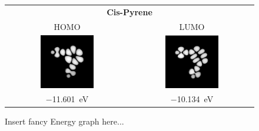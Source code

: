 
	\graphicspath{{./images/molecules/orbitals/cis-pyrene/}}
	\begin{figure}[]
		\begin{minipage}{0.2\textwidth} \centering
		\end{minipage}
		\hfill
		\begin{minipage}{0.4\textwidth} \centering 
			\begin{tabular}{c|c}
				\multicolumn{2}{c}{\textbf{Cis-Pyrene}} \\
				HOMO & LUMO \\
				\includegraphics[width=0.45\textwidth]{homo} &
				\includegraphics[width=0.45\textwidth]{lumo} \\
				\SI{-11.601}{\electronvolt} & \SI{-10.134 }{\electronvolt} \\
			\end{tabular}
		\end{minipage}
		\hfill
		\begin{minipage}{0.2\textwidth} \centering
			Insert fancy Energy graph here...	
		\end{minipage}
	\end{figure}
